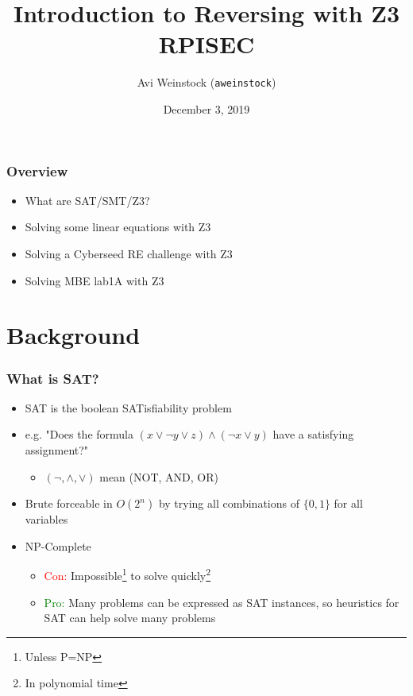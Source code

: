 \documentclass[aspectratio=169]{beamer}
\title{Introduction to Reversing with Z3\\RPISEC}
\date{December 3, 2019}
\author{Avi Weinstock (\Verb|aweinstock|)}
\begin{document}
\maketitle

\begin{frame}[fragile]
\frametitle{Overview}
\begin{itemize}
\item What are SAT/SMT/Z3?
\item Solving some linear equations with Z3
\item Solving a Cyberseed RE challenge with Z3
\item Solving MBE lab1A with Z3
\end{itemize}
\end{frame}

\section{Background}

\begin{frame}[fragile]
\frametitle{What is SAT?}
\begin{itemize}
\item SAT is the boolean SATisfiability problem
\item e.g. "Does the formula $(x \lor \neg y \lor z) \land (\neg x \lor y)$ have a satisfying assignment?"
\begin{itemize}
\item $(\neg, \land, \lor)$ mean (NOT, AND, OR)
\end{itemize}
\item Brute forceable in $O(2^n)$ by trying all combinations of $\{0,1\}$ for all variables
\item NP-Complete 
\begin{itemize}
\item \textcolor{red}{Con:} Impossible\footnote{Unless P=NP} to solve quickly\footnote{In polynomial time}
\item \textcolor{green}{Pro:} Many problems can be expressed as SAT instances, so heuristics for SAT can help solve many problems
\end{itemize}
\end{itemize}
\end{frame}
\end{document}
